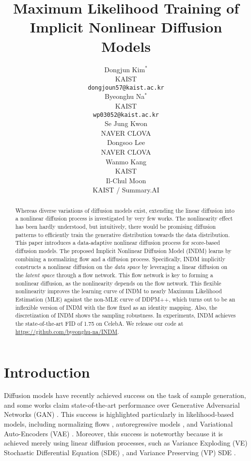 \documentclass{article}
\title{Maximum Likelihood Training of\\Implicit Nonlinear Diffusion Models}
\author{Dongjun Kim$^{*}$\\KAIST \\
	\texttt{dongjoun57@kaist.ac.kr} \\
	\And
	Byeonghu Na$^{*}$\\
	KAIST \\
	\texttt{wp03052@kaist.ac.kr} \\
	\And
	Se Jung Kwon \\
	NAVER CLOVA \\
	\And
	Dongsoo Lee \\
	NAVER CLOVA \\
	\And
	Wanmo Kang \\
	KAIST \\
	\And
	Il-Chul Moon \\
	KAIST / Summary.AI \\
}
\theoremstyle{definition}
\theoremstyle{remark}
\begin{document}
	
	
	\maketitle
	\doparttoc
	\parttoc
	\def\thefootnote{*}
	\def\thefootnote{\arabic{footnote}}
	
	\begin{abstract}
		Whereas diverse variations of diffusion models exist, extending the linear diffusion into a nonlinear diffusion process is investigated by very few works. The nonlinearity effect has been hardly understood, but intuitively, there would be promising diffusion patterns to efficiently train the generative distribution towards the data distribution. This paper introduces a data-adaptive nonlinear diffusion process for score-based diffusion models. The proposed Implicit Nonlinear Diffusion Model (INDM) learns by combining a normalizing flow and a diffusion process. Specifically, INDM implicitly constructs a nonlinear diffusion on the \textit{data space} by leveraging a linear diffusion on the \textit{latent space} through a flow network. This flow network is key to forming a nonlinear diffusion, as the nonlinearity depends on the flow network. This flexible nonlinearity improves the learning curve of INDM to nearly Maximum Likelihood Estimation (MLE) against the non-MLE curve of DDPM++, which turns out to be an inflexible version of INDM with the flow fixed as an identity mapping. Also, the discretization of INDM shows the sampling robustness. In experiments, INDM achieves the state-of-the-art FID of 1.75 on CelebA. We release our code at \url{https://github.com/byeonghu-na/INDM}.
	\end{abstract}
	
	\reqnomode
	
	\section{Introduction}
	\label{sec:Introduction}
	
	Diffusion models have recently achieved success on the task of sample generation, and some works \cite{song2020score, dhariwal2021diffusion} claim state-of-the-art performance over Generative Adversarial Networks (GAN) \citep{karras2019style}. This success is highlighted particularly in likelihood-based models, including normalizing flows \citep{grcic2021densely}, autoregressive models \citep{parmar2018image}, and Variational Auto-Encoders (VAE) \citep{vahdat2020nvae}. Moreover, this success is noteworthy because it is achieved merely using linear diffusion processes, such as Variance Exploding (VE) Stochastic Differential Equation (SDE) \citep{song2020improved}, and Variance Preserving (VP) SDE \citep{ho2020denoising}.
	
\end{document}
